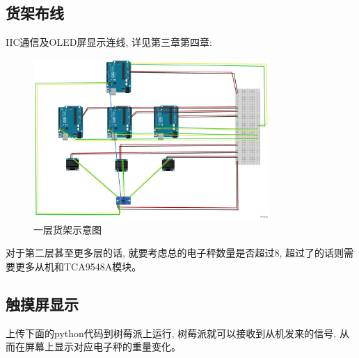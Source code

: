\documentclass{article}
\begin{document}
\newpage
\subsection{货架布线}
IIC通信及OLED屏显示连线, 详见第三章第四章:
\begin{figure}[h]
  \centering
  \includegraphics[width=0.8\textwidth]{../../4_Chapter4_COMMUNICATION/Picture/一层货架示意图.pdf}
  \caption{一层货架示意图}
  \label{fig:一层货架示意图}
\end{figure}

对于第二层甚至更多层的话, 就要考虑总的电子秤数量是否超过8, 超过了的话则需要更多从机和TCA9548A模块。

\subsection{触摸屏显示}
上传下面的python代码到树莓派上运行, 树莓派就可以接收到从机发来的信号, 从而在屏幕上显示对应电子秤的重量变化。
\end{document}
